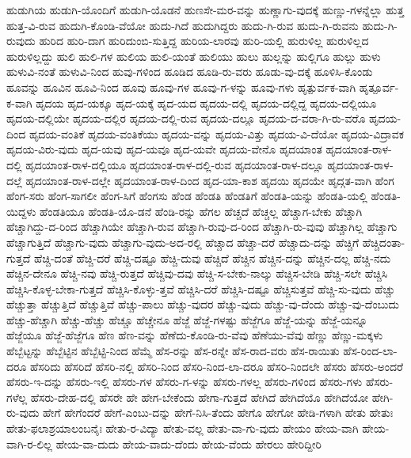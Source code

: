 {ಹುಡುಗಿಯ
ಹುಡುಗಿ-ಯೊಂದಿಗೆ
ಹುಡುಗಿ-ಯೊಡನೆ
ಹುಣಸೇ-ಮರ-ವನ್ನು
ಹುಣ್ಣಾಗು-ವುದಕ್ಕೆ
ಹುಣ್ಣು-ಗಳನ್ನೆಲ್ಲಾ
ಹುತ್ತ
ಹುತ್ತ-ವಿ-ರುವ
ಹುದುಗಿ-ಕೊಂಡಿ-ವೆಯೋ
ಹುದು-ಗಿದೆ
ಹುದುಗಿದ್ದರು
ಹುದು-ಗಿ-ರುವ
ಹುದು-ಗಿ-ರುವನು
ಹುದು-ಗಿ-ರುವುದು
ಹುರಿದ
ಹುರಿ-ದಾಗ
ಹುರಿದುಂಬಿ-ಸುತ್ತಿದ್ದ
ಹುರಿಯ-ಲಾರವು
ಹುರಿ-ಯಲ್ಲಿ
ಹುರುಳಿಲ್ಲ
ಹುರುಳಿಲ್ಲದ
ಹುರುಳಿಲ್ಲದ್ದು
ಹುಲಿ
ಹುಲಿ-ಗಳ
ಹುಲಿಯ
ಹುಲಿ-ಯಂತೆ
ಹುಲಿಯು
ಹುಲು
ಹುಲ್ಲನ್ನು
ಹುಲ್ಲಿಗೂ
ಹುಲ್ಲು
ಹುಳು
ಹುಳುವಿ-ನಂತೆ
ಹುಳುವಿ-ನಿಂದ
ಹುವು-ಗಳಿಂದ
ಹೂಡಿದ
ಹೂಡಿ-ರು-ವರು
ಹೂಡು-ವು-ದಕ್ಕೆ
ಹೂಳಿಸಿ-ಕೊಂಡು
ಹೂವನ್ನು
ಹೂವಿನ
ಹೂವಿ-ನಿಂದ
ಹೂವು
ಹೂವು-ಗಳ
ಹೂವು-ಗ-ಳನ್ನು
ಹೂವು-ಗಳು
ಹೃತ್ಪುರ್ವಕ-ವಾಗಿ
ಹೃತ್ಪೂರ್ವ-ಕ-ವಾಗಿ
ಹೃದಯ
ಹೃದ-ಯಕ್ಕೂ
ಹೃದ-ಯಕ್ಕೆ
ಹೃದ-ಯದ
ಹೃದಯ-ದಲ್ಲಿ
ಹೃದಯ-ದಲ್ಲಿದ್ದ
ಹೃದಯ-ದಲ್ಲಿಯೂ
ಹೃದಯ-ದಲ್ಲಿಯೇ
ಹೃದಯ-ದಲ್ಲಿರ
ಹೃದಯ-ದಲ್ಲಿ-ರುವ
ಹೃದಯ-ದಲ್ಲೂ
ಹೃದಯ-ದ-ವರಾ-ಗಿ-ರು-ವರೊ
ಹೃದಯ-ದಿಂದ
ಹೃದಯ-ವಂತಿಕೆ
ಹೃದಯ-ವಂತಿಕೆಯು
ಹೃದಯ-ವನ್ನು
ಹೃದಯ-ವಿತ್ತು
ಹೃದಯ-ವಿ-ದೆಯೋ
ಹೃದಯ-ವಿದ್ರಾವಕ
ಹೃದಯ-ವಿರು-ವುದು
ಹೃದ-ಯವು
ಹೃದ-ಯವೂ
ಹೃದ-ಯವೇ
ಹೃದಯ-ವೇನೊ
ಹೃದಯಾಂತ
ಹೃದಯಾಂತ-ರಾಳ-ದಲ್ಲಿ
ಹೃದಯಾಂತ-ರಾಳ-ದಲ್ಲಿಯೂ
ಹೃದಯಾಂತ-ರಾಳ-ದಲ್ಲಿ-ರುವ
ಹೃದಯಾಂತ-ರಾಳ-ದಲ್ಲೂ
ಹೃದಯಾಂತ-ರಾಳ-ದಲ್ಲೆ
ಹೃದಯಾಂತ-ರಾಳ-ದಲ್ಲೇ
ಹೃದಯಾಂತ-ರಾಳ-ದಿಂದ
ಹೃದ-ಯಾ-ಕಾಶ
ಹೃದಯಿ
ಹೃದಯೇ
ಹೃದ್ಗತ-ವಾಗಿ
ಹೆಂಗ
ಹೆಂಗ-ಸರು
ಹೆಂಗ-ಸಾಗಲೀ
ಹೆಂಗ-ಸಿಗೆ
ಹೆಂಗಸು
ಹೆಂಡ
ಹೆಂಡತಿ
ಹೆಂಡತಿಗೆ
ಹೆಂಡತಿ-ಯನ್ನು
ಹೆಂಡತಿ-ಯಲ್ಲಿ
ಹೆಂಡತಿ-ಯಿದ್ದಳು
ಹೆಂಡತಿಯೂ
ಹೆಂಡತಿ-ಯೊ-ಡನೆ
ಹೆಂಡಿ-ರನ್ನು
ಹೆಗಲ
ಹೆಚ್ಚದೆ
ಹೆಚ್ಚಲ್ಲ
ಹೆಚ್ಚಾಗ-ಬೇಕು
ಹೆಚ್ಚಾಗಿ
ಹೆಚ್ಚಾಗಿದ್ದು-ದ-ರಿಂದ
ಹೆಚ್ಚಾಗಿಯೇ
ಹೆಚ್ಚಾಗಿ-ರುವ
ಹೆಚ್ಚಾಗಿ-ರುವು-ದ-ರಿಂದ
ಹೆಚ್ಚಾಗಿ-ರು-ವುವು
ಹೆಚ್ಚಾಗಿಲ್ಲ
ಹೆಚ್ಚಾಗು
ಹೆಚ್ಚಾಗುತ್ತಿದೆ
ಹೆಚ್ಚಾಗು-ವುದು
ಹೆಚ್ಚಾಗು-ವುದು-ಅದ-ರಲ್ಲಿ
ಹೆಚ್ಚಾದ
ಹೆಚ್ಚಾ-ದರೆ
ಹೆಚ್ಚಾದು-ದನ್ನು
ಹೆಚ್ಚಿಗೆ
ಹೆಚ್ಚಿದಂತಾ-ಗುತ್ತದೆ
ಹೆಚ್ಚಿ-ದಂತೆ
ಹೆಚ್ಚಿ-ದರೆ
ಹೆಚ್ಚಿ-ದಷ್ಟೂ
ಹೆಚ್ಚಿ-ದುವು
ಹೆಚ್ಚಿದೆ
ಹೆಚ್ಚಿನ
ಹೆಚ್ಚಿನ-ದನ್ನು
ಹೆಚ್ಚಿನ-ದಲ್ಲ
ಹೆಚ್ಚಿ-ನದು
ಹೆಚ್ಚಿನ-ದೇನೂ
ಹೆಚ್ಚಿ-ನವು
ಹೆಚ್ಚಿ-ರುತ್ತದೆ
ಹೆಚ್ಚಿವು-ದವು
ಹೆಚ್ಚಿ-ಸ-ಬೇಕು-ನಾಲ್ಕು
ಹೆಚ್ಚಿಸ-ಬೇಡಿ
ಹೆಚ್ಚಿ-ಸಲೇ
ಹೆಚ್ಚಿಸಿ
ಹೆಚ್ಚಿಸಿ-ಕೊಳ್ಳ-ಬೇಕಾ-ಗುತ್ತದೆ
ಹೆಚ್ಚಿಸಿ-ಕೊಳ್ಳು-ತ್ತವೆ
ಹೆಚ್ಚಿಸಿ-ದರೆ
ಹೆಚ್ಚಿಸಿ-ದಷ್ಟೂ
ಹೆಚ್ಚಿಸುತ್ತವೆ
ಹೆಚ್ಚಿ-ಸು-ವುದು
ಹೆಚ್ಚು
ಹೆಚ್ಚುತ್ತಾ
ಹೆಚ್ಚುತ್ತಿದೆ
ಹೆಚ್ಚುತ್ತಿವೆ
ಹೆಚ್ಚು-ಪಾಲು
ಹೆಚ್ಚು-ವುದರ
ಹೆಚ್ಚು-ವುದು
ಹೆಚ್ಚು-ವು-ದೆಂದು
ಹೆಚ್ಚು-ವು-ದೆಂಬುದು
ಹೆಚ್ಚು-ಹೆಚ್ಚಾಗಿ
ಹೆಚ್ಚು-ಹೆಚ್ಚು
ಹೆಚ್ಚೂ
ಹೆಚ್ಚೇನೂ
ಹೆಜ್ಜೆ
ಹೆಜ್ಜೆ-ಗಳಷ್ಟು
ಹೆಜ್ಜೆಗೂ
ಹೆಜ್ಜೆ-ಯನ್ನು
ಹೆಜ್ಜೆ-ಯನ್ನೂ
ಹೆಜ್ಜೆಯೂ
ಹೆಜ್ಜೆ-ಹೆಜ್ಜೆಗೂ
ಹೆಣ
ಹೆಣ-ವನ್ನು
ಹೆಣೆದು-ಕೊಂಡಿ-ರು-ವೆವು
ಹೆಣೆಯು-ವೆವು
ಹೆಣ್ಣು
ಹೆಣ್ಣು-ಮಕ್ಕಳು
ಹೆಬ್ಬೆಟ್ಟನ್ನು
ಹೆಬ್ಬೆಟ್ಟಿನ
ಹೆಬ್ಬೆಟ್ಟಿ-ನಿಂದ
ಹೆಮ್ಮೆ
ಹೆಸ-ರನ್ನು
ಹೆಸ-ರನ್ನೇ
ಹೆಸ-ರಾದ-ವರು
ಹೆಸ-ರಾಯಿತು
ಹೆಸ-ರಿಂದ-ಲಾ-ದರೂ
ಹೆಸರಿದು
ಹೆಸರಿದೆ
ಹೆಸರಿ-ನಲ್ಲಿ
ಹೆಸರಿ-ನಿಂದ
ಹೆಸರಿ-ನಿಂದ-ಲಾ-ದರೂ
ಹೆಸರಿ-ನಿಂದಲೇ
ಹೆಸರು
ಹೆಸರು-ಅಂದರೆ
ಹೆಸರು-ಇ-ದನ್ನು
ಹೆಸರು-ಇಲ್ಲಿ
ಹೆಸರು-ಗಳ
ಹೆಸರು-ಗ-ಳನ್ನು
ಹೆಸರು-ಗಳಲ್ಲ
ಹೆಸರು-ಗಳಿಂದ
ಹೆಸರು-ಗಳು
ಹೆಸರು-ಗಳೆಲ್ಲ
ಹೆಸರು-ದೇಹ-ದಲ್ಲಿ
ಹೆಸರೇ
ಹೇ
ಹೇಗ-ಬೇಕೆಂದು
ಹೇಗಾ-ಗುತ್ತದೆ
ಹೇಗಿದೆ
ಹೇಗಿದೆಯೊ
ಹೇಗಿದೆಯೋ
ಹೇಗಿ-ರು-ವುದು
ಹೇಗೆ
ಹೇಗೆಂದರೆ
ಹೇಗೆ-ಎಂಬು-ದನ್ನು
ಹೇಗೆ-ನಿಸಿ-ತೆಂದು
ಹೇಗೊ
ಹೇಗೋ
ಹೇಡಿ-ಗಳಾಗಿ
ಹೇತು
ಹೇತುಃ
ಹೇತು-ಫಲಾಶ್ರಯಾಲಂಬನೈಃ
ಹೇತು-ರ-ವಿದ್ಯಾ
ಹೇತು-ವಲ್ಲ
ಹೇತು-ವಾ-ಗು-ವುದು
ಹೇಯಂ
ಹೇಯ-ವಾಗಿ
ಹೇಯ-ವಾಗಿ-ರ-ಲಿಲ್ಲ
ಹೇಯ-ವಾ-ದುದು
ಹೇಯ-ವಾದು-ದೆಂದು
ಹೇಯ-ವೆಂದು
ಹೇರಲು
ಹೇರಿದ್ದೀರಿ
}
